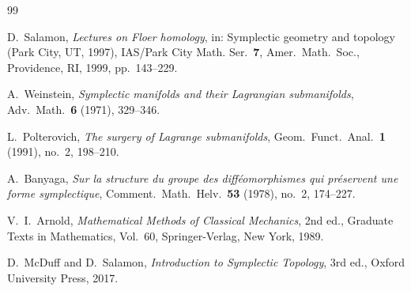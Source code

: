 \documentclass[12pt]{article}
\theoremstyle{definition}
\begin{document}
\begin{thebibliography}{99}

D.~Salamon,
\emph{Lectures on Floer homology},
in: Symplectic geometry and topology (Park City, UT, 1997),
IAS/Park City Math. Ser.\ \textbf{7}, Amer.\ Math.\ Soc., Providence, RI, 1999, pp.~143--229.

A.~Weinstein,
\emph{Symplectic manifolds and their Lagrangian submanifolds},
Adv.\ Math.\ \textbf{6} (1971), 329--346.

L.~Polterovich,
\emph{The surgery of Lagrange submanifolds},
Geom.\ Funct.\ Anal.\ \textbf{1} (1991), no.~2, 198--210.

A.~Banyaga,
\emph{Sur la structure du groupe des diff\'{e}omorphismes qui pr\'{e}servent une forme symplectique},
Comment.\ Math.\ Helv.\ \textbf{53} (1978), no.~2, 174--227.

V.~I.~Arnold,
\emph{Mathematical Methods of Classical Mechanics},
2nd ed., Graduate Texts in Mathematics, Vol.~60,
Springer-Verlag, New York, 1989.

D.~McDuff and D.~Salamon,
\emph{Introduction to Symplectic Topology},
3rd ed., Oxford University Press, 2017.

\end{thebibliography}
\end{document}
